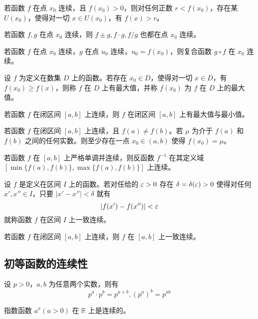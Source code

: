 \begin{theorem}[局部保号性]
	若函数 $f$ 在点 $x_0$ 连续，且 $f(x_0)>0$，则对任何正数 $r<f(x_0)$，存在某 $U(x_0)$，使得对一切 $x\in U(x_0)$，有 $f(x)>r$。
\end{theorem}

\begin{theorem}[四则运算]
	若函数 $f,g$ 在点 $x_0$ 连续，则 $f\pm g,f\cdot g,f/g$ 也都在点 $x_0$ 连续。
\end{theorem}

\begin{theorem}
	若函数 $f$ 在点 $x_0$ 连续，$g$ 在点 $u_0$ 连续，$u_0=f(x_0)$，则复合函数 $g\circ f$ 在 $x_0$ 连续。
\end{theorem}

\begin{definition}
	设 $f$ 为定义在数集 $D$ 上的函数。若存在 $x_0\in D$，使得对一切 $x\in D$，有 $f(x_0)\ge f(x)$，则称 $f$ 在 $D$ 上有最大值，并称 $f(x_0)$ 为 $f$ 在 $D$ 上的最大值。
\end{definition}

\begin{theorem}[最大、最小值定理]
	若函数 $f$ 在闭区间 $[a,b]$ 上连续，则 $f$ 在闭区间 $[a,b]$ 上有最大值与最小值。
\end{theorem}

\begin{theorem}[介值定理]
	若函数 $f$ 在闭区间 $[a,b]$ 上连续，且 $f(a)\ne f(b)$。若 $\mu$ 为介于 $f(a)$ 和 $f(b)$ 之间的任何实数。则至少存在一点 $x_0\in (a,b)$ 使得 $f(x_0)=\mu$。
\end{theorem}

\begin{theorem}
	若函数 $f$ 在 $[a,b]$ 上严格单调并连续，则反函数 $f^{-1}$ 在其定义域 $[\min\{f(a),f(b)\},\max\{f(a),f(b)\}]$ 上连续。
\end{theorem}

\begin{definition}
	设 $f$ 是定义在区间 $I$ 上的函数。若对任给的 $\varepsilon>0$ 存在 $\delta=\delta(\varepsilon)>0$ 使得对任何 $x',x''\in I$，只要 $|x'-x''|<\delta$ 就有
	\[ |f(x')-f(x'')|<\varepsilon \]
	就称函数 $f$ 在区间 $I$ 上一致连续。
\end{definition}

\begin{theorem}[一致连续性]
	若函数 $f$ 在闭区间 $[a,b]$ 上连续，则 $f$ 在 $[a,b]$ 上一致连续。
\end{theorem}

\subsection{初等函数的连续性}

\begin{theorem}
	设 $p>0$，$a,b$ 为任意两个实数，则有
	\[ p^a\cdot p^b = p^{a+b},(p^a)^b=p^{ab} \]
\end{theorem}

\begin{theorem}
	指数函数 $a^x(a>0)$ 在 $\mathbb{R}$ 上是连续的。
\end{theorem}


